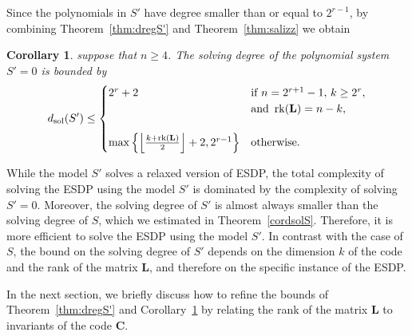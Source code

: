 \documentclass[11pt]{article}
\DeclarePairedDelimiter{\fl}{\lfloor}{\rfloor}
\theoremstyle{plain}
\newtheorem{cor}[theo]{Corollary}
\theoremstyle{definition}
\theoremstyle{remark}
\begin{document}
Since the polynomials in $S'$ have degree smaller than or equal to $2^{r-1}$, by combining Theorem~\ref{thm:dregS'} and Theorem~\ref{thm:salizz} we obtain
\begin{cor}\label{cordsolS'}
suppose that $n\geq 4$. The solving degree of the polynomial system $S'=0$ is bounded by
    \begin{equation*}
        d_{\operatorname{sol}}(S')\leq\begin{cases}
            2^r+2 & \text{if }n=2^{r+1}-1,\,k\geq 2^r,\\
            &\text{and }\operatorname{rk}(\mathbf{L})=n-k,\\
            \\
            \max\left\{\fl*{\frac{k+\operatorname{rk}(\mathbf{L})}{2}}+2,2^{r-1}\right\} & \text{otherwise}.\\
        \end{cases}
    \end{equation*}
\end{cor}
While the model $S'$ solves a relaxed version of ESDP, the total complexity of solving the ESDP using the model $S'$ is dominated by the complexity of solving $S'=0$. Moreover, the solving degree of $S'$ is almost always smaller than the solving degree of $S$, which we estimated in Theorem~\ref{cordsolS}. Therefore, it is more efficient to solve the ESDP using the model $S'$. In contrast with the case of $S$, the bound on the solving degree of $S'$ depends on the dimension $k$ of the code and the rank of the matrix $\mathbf{L}$, and therefore on the specific instance of the ESDP. 

In the next section, we briefly discuss how to refine the bounds of Theorem~\ref{thm:dregS'} and Corollary~\ref{cordsolS'} by relating the rank of the matrix $\mathbf{L}$ to invariants of the code $\mathbf{C}$. 
\end{document}
